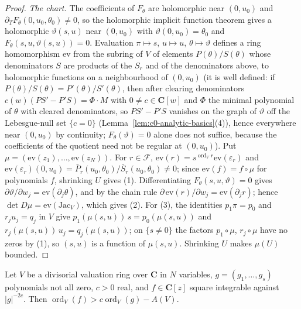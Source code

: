 \begin{proof}
\emph{The chart.} The coefficients of $F_\theta$ are holomorphic near $(0,u_0)$ and $\partial_TF_\theta(0,u_0,\theta_0)\ne0$, so the holomorphic
implicit function theorem gives a holomorphic $\vartheta(s,u)$ near $(0,u_0)$ with $\vartheta(0,u_0)=\theta_0$ and
$F_\theta(s,u,\vartheta(s,u))=0$. Evaluation $\pi\mapsto s$, $u\mapsto u$, $\theta\mapsto\vartheta$ defines a ring homomorphism $\mathrm{ev}$ from the
subring of $V$ of elements $P(\theta)/S(\theta)$ whose denominators $S$ are products of the $S_r$ and of the denominators above, to
holomorphic functions on a neighbourhood of $(0,u_0)$ (it is well defined: if $P(\theta)/S(\theta)=P'(\theta)/S'(\theta)$, then after clearing denominators $c(w)(PS'-P'S)=\Phi\cdot M$ with $0\ne c\in\mathbf C[w]$ and $\Phi$ the minimal polynomial of $\theta$ with cleared denominators, so $PS'-P'S$ vanishes on the graph of $\vartheta$ off the Lebesgue-null set $\{c=0\}$ (Lemma~\ref{lem:c0-analytic-basics}(4)), hence everywhere near $(0,u_0)$ by continuity; $F_\theta(\vartheta)=0$ alone does not suffice, because the coefficients of the quotient need not be regular at $(0,u_0)$). Put
$\mu=(\mathrm{ev}(z_1),\dots,\mathrm{ev}(z_N))$. For $r\in\mathcal F$, $\mathrm{ev}(r)=s^{\operatorname{ord}_Vr}\mathrm{ev}(\varepsilon_r)$ and
$\mathrm{ev}(\varepsilon_r)(0,u_0)=\bar P_r(u_0,\theta_0)/\bar S_r(u_0,\theta_0)\ne0$; since $\mathrm{ev}(f)=f\circ\mu$ for polynomials $f$, shrinking
$U$ gives (1). Differentiating $F_\theta(s,u,\vartheta)=0$ gives $\partial\vartheta/\partial w_j=\mathrm{ev}(\partial_j\theta)$, and by the chain rule
$\partial\,\mathrm{ev}(r)/\partial w_j=\mathrm{ev}(\partial_jr)$; hence $\det D\mu=\mathrm{ev}(\mathrm{Jac}_V)$, which gives (2). For (3), the identities
$p_1\pi=p_0$ and $r_ju_j=q_j$ in $V$ give $p_1(\mu(s,u))\,s=p_0(\mu(s,u))$ and $r_j(\mu(s,u))\,u_j=q_j(\mu(s,u))$; on $\{s\ne0\}$ the factors
$p_1\circ\mu$, $r_j\circ\mu$ have no zeros by (1), so $(s,u)$ is a function of $\mu(s,u)$. Shrinking $U$ makes $\mu(U)$ bounded.
\end{proof}

\begin{proposition}\label{prop:c0-valuative-bound}
\leanok
{}
Let $V$ be a divisorial valuation ring over $\mathbf C$ in $N$ variables, $g=(g_1,\dots,g_s)$ polynomials not all zero, $c>0$ real,
and $f\in\mathbf C[z]$ square integrable against $|g|^{-2c}$. Then $\operatorname{ord}_V(f)>c\operatorname{ord}_V(g)-A(V)$.
\end{proposition}

